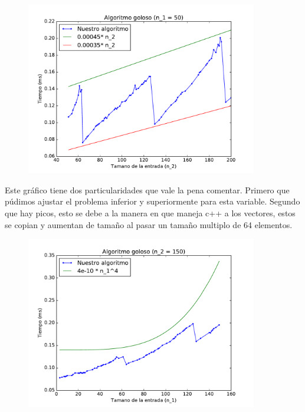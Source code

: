 \begin{figure}[H]
 \centering
	\includegraphics[width=0.9\textwidth]{graficos/problema_4/tiempos_2.pdf}
	\caption{}
	\label{fig:problema4-2}
\end{figure}

Este gráfico tiene dos particularidades que vale la pena comentar. Primero que púdimos ajustar el problema inferior y superiormente para esta variable. Segundo que hay picos, esto se debe a la manera en que maneja c++ a los vectores, estos se copian y aumentan de tamaño al pasar un tamaño multiplo de 64 elementos.

\begin{figure}[H]
 \centering
	\includegraphics[width=0.9\textwidth]{graficos/problema_4/tiempos_3.pdf}
	\caption{}
	\label{fig:problema4-3}
\end{figure}

